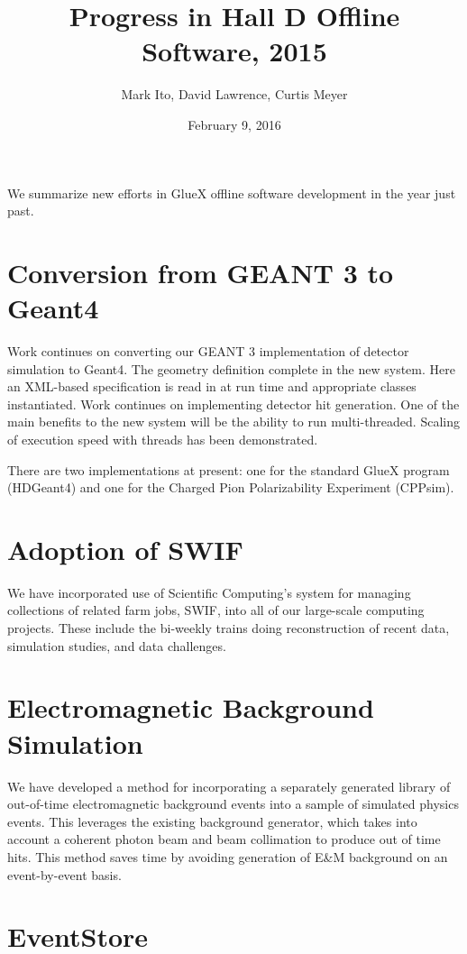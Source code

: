 \documentclass[12pt]{article}
\title{Progress in Hall D Offline Software, 2015}
\author{Mark Ito, David Lawrence, Curtis Meyer}
\date{February 9, 2016}
\begin{document}
\maketitle

We summarize new efforts in GlueX offline software development in the year just past.

\section{Conversion from GEANT 3 to Geant4}

Work continues on converting our GEANT 3 implementation of detector
simulation to Geant4. The geometry definition complete in the new
system. Here an XML-based specification is read in at run time and
appropriate classes instantiated. Work continues on implementing
detector hit generation. One of the main benefits to the new system
will be the ability to run multi-threaded. Scaling of execution speed
with threads has been demonstrated.

There are two implementations at present: one for the standard GlueX
program (HDGeant4)\cite{g4-gluex} and one for the Charged Pion
Polarizability Experiment (CPPsim)\cite{g4-cpp}.

\section{Adoption of SWIF}

We have incorporated use of Scientific Computing's system for managing
collections of related farm jobs, SWIF, into all of our large-scale
computing projects. These include the bi-weekly trains doing reconstruction of
recent data, simulation studies, and data challenges.

\section{Electromagnetic Background Simulation}

We have developed a method for incorporating a separately generated
library of out-of-time electromagnetic background events into a sample
of simulated physics events. This leverages the existing background
generator, which takes into account a coherent photon beam and beam
collimation to produce out of time hits. This method saves time by
avoiding generation of E\&M background on an event-by-event basis.

\section{EventStore}
\end{document}
